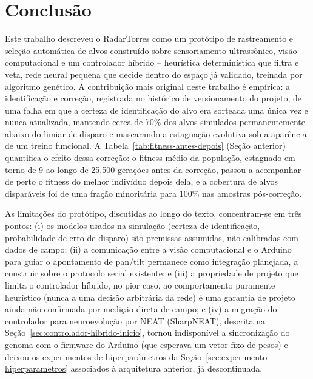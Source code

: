 \documentclass[12pt,a4paper]{article}
\begin{document}
\section{Conclusão}

Este trabalho descreveu o RadarTorres como um protótipo de rastreamento e seleção automática de
alvos construído sobre sensoriamento ultrassônico, visão computacional e um controlador híbrido
-- heurística determinística que filtra e veta, rede neural pequena que decide dentro do espaço já
validado, treinada por algoritmo genético. A contribuição mais original deste trabalho é empírica:
a identificação e correção, registrada no histórico de versionamento do projeto, de uma falha em
que a certeza de identificação do alvo era sorteada uma única vez e nunca atualizada, mantendo
cerca de 70\% dos alvos
simulados permanentemente abaixo do limiar de disparo e mascarando a estagnação evolutiva sob a
aparência de um treino funcional. A Tabela~\ref{tab:fitness-antes-depois} (Seção anterior) quantifica
o efeito dessa correção: o fitness médio da população, estagnado em torno de 9 ao longo de 25.500
gerações antes da correção, passou a acompanhar de perto o fitness do melhor indivíduo depois dela,
e a cobertura de alvos disparáveis foi de uma fração minoritária para 100\% nas amostras
pós-correção.

As limitações do protótipo, discutidas ao longo do texto, concentram-se em três pontos: (i) os
modelos usados na simulação (certeza de identificação, probabilidade de erro de disparo) são
premissas assumidas, não calibradas com dados de campo; (ii) a comunicação entre a visão
computacional e o Arduino para guiar o apontamento de pan/tilt permanece como integração planejada,
a construir sobre o protocolo serial existente; e (iii) a propriedade de projeto que limita o
controlador híbrido, no pior caso, ao comportamento puramente heurístico (nunca a uma decisão
arbitrária da rede) é uma garantia de projeto ainda não confirmada por medição direta de campo; e
(iv) a migração do controlador para neuroevolução por NEAT (SharpNEAT), descrita na
Seção~\ref{sec:controlador-hibrido-inicio}, tornou indisponível a sincronização do genoma com o
firmware do Arduino (que esperava um vetor fixo de pesos) e deixou os experimentos de
hiperparâmetros da Seção~\ref{sec:experimento-hiperparametros} associados à arquitetura anterior,
já descontinuada.
\end{document}
